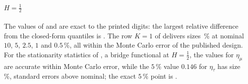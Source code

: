 \paragraph{$H=\frac12$} The values of \citet{AP97} and \citet{KV02} are exact to the printed digits: the largest
relative difference from the closed-form quantiles is . The row $K=1$ of \citet[Table~1]{Lob01}
delivers sizes \,\% at nominal $10$, $5$, $2.5$, $1$ and $0.5\,\%$, all within the Monte Carlo
error of the published design. For the stationarity statistics of \citet{KPSS92}, a bridge functional at $H=\frac12$,
the values for $\eta_\mu$ are accurate within Monte Carlo error, while the $5\,\%$ value $0.146$ for $\eta_\tau$ has size
\,\%,  standard errors above nominal; the exact $5\,\%$ point is
.


